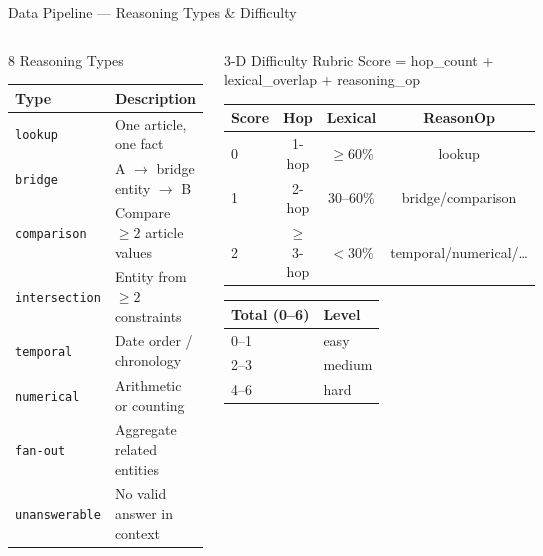 \documentclass[aspectratio=169]{beamer}
\newcommand{\pos}[1]{\textcolor{positive}{#1}}
\newcommand{\con}[1]{\textcolor{negative}{#1}}
\newcommand{\HL}[1]{\textcolor{emphasis}{#1}}
\begin{document}
\begin{frame}[shrink=15]{Data Pipeline --- Reasoning Types \& Difficulty}
\begin{columns}[T]
\begin{block}{8 Reasoning Types}
\begin{tabular}{@{}lp{3.5cm}@{}}
\toprule
\textbf{Type} & \textbf{Description} \\
\midrule
\texttt{lookup}        & One article, one fact \\
\texttt{bridge}        & A $\to$ bridge entity $\to$ B \\
\texttt{comparison}    & Compare $\geq 2$ article values \\
\texttt{intersection}  & Entity from $\geq 2$ constraints \\
\texttt{temporal}      & Date order / chronology \\
\texttt{numerical}     & Arithmetic or counting \\
\texttt{fan-out}       & Aggregate related entities \\
\texttt{unanswerable}  & No valid answer in context \\
\bottomrule
\end{tabular}
\end{block}

\begin{block}{3-D Difficulty Rubric}
{\small Score = hop\_count + lexical\_overlap + reasoning\_op}\\[4pt]
\begin{tabular}{@{}lccc@{}}
\toprule
\textbf{Score} & \textbf{Hop} & \textbf{Lexical} & \textbf{ReasonOp} \\
\midrule
0 & 1-hop     & $\geq 60\%$ & lookup \\
1 & 2-hop     & 30--60\%    & bridge/comparison \\
2 & $\geq$3-hop & $< 30\%$ & temporal/numerical/\ldots \\
\bottomrule
\end{tabular}

\vspace{4pt}
\begin{tabular}{@{}ll@{}}
\toprule
\textbf{Total (0--6)} & \textbf{Level} \\
\midrule
0--1 & \HL{easy} \\
2--3 & \con{medium} \\
4--6 & \pos{hard} \\
\bottomrule
\end{tabular}
\end{block}
\end{columns}
\end{frame}
\end{document}
